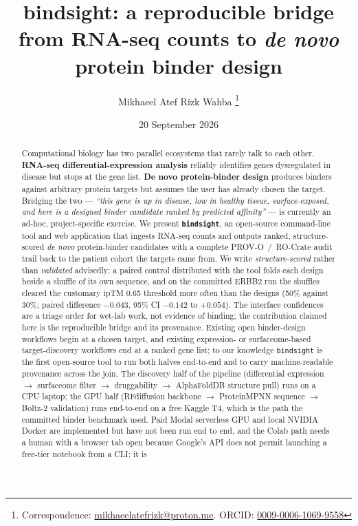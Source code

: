 \documentclass[11pt,letterpaper]{article}
\title{\textbf{bindsight: a reproducible bridge from RNA-seq counts to \textit{de novo} protein binder design}}
\author[1]{Mikhaeel Atef Rizk Wahba%
  \thanks{Correspondence: \href{mailto:mikhaeelatefrizk@proton.me}{mikhaeelatefrizk@proton.me}.
  ORCID: \href{https://orcid.org/0009-0006-1069-9558}{0009-0006-1069-9558}}}
\affil[1]{Independent Researcher, Cairo, Egypt}
\date{20 September 2026}
\begin{document}
\maketitle

\begin{abstract}
\noindent
Computational biology has two parallel ecosystems that rarely talk to each
other. \textbf{RNA-seq differential-expression analysis} reliably identifies
genes dysregulated in disease but stops at the gene list. \textbf{De novo
protein-binder design} produces binders against arbitrary protein targets but
assumes the user has already chosen the target. Bridging the two —
\textit{``this gene is up in disease, low in healthy tissue, surface-exposed,
and here is a designed binder candidate ranked by predicted affinity''} —
is currently an ad-hoc, project-specific exercise. We present
\textbf{\texttt{bindsight}}, an open-source command-line tool and web
application that ingests RNA-seq counts and outputs ranked,
structure-scored \textit{de novo} protein-binder candidates with a complete
PROV-O~/~RO-Crate audit trail back to the patient cohort the targets came
from. We write \emph{structure-scored} rather than \emph{validated}
advisedly: a paired control distributed with the tool folds each design beside
a shuffle of its own sequence, and on the committed ERBB2 run the shuffles
cleared the customary ipTM 0.65 threshold more often than the designs
(50\% against 30\%; paired difference $-0.043$, 95\% CI $-0.142$ to
$+0.054$). The interface confidences are a triage order for wet-lab work, not
evidence of binding; the contribution claimed here is the reproducible bridge
and its provenance. Existing open binder-design workflows begin at a chosen target, and
existing expression- or surfaceome-based target-discovery workflows end at a
ranked gene list; to our knowledge \texttt{bindsight} is the first open-source
tool to run both halves end-to-end and to carry machine-readable provenance
across the join. The discovery half of the pipeline (differential expression $\to$
surfaceome filter $\to$ druggability $\to$ AlphaFoldDB structure pull) runs
on a CPU laptop; the GPU half (RFdiffusion backbone $\to$
ProteinMPNN sequence $\to$ Boltz-2 validation) runs end-to-end on a free
Kaggle T4, which is the path the committed binder benchmark used. Paid Modal
serverless GPU and local NVIDIA Docker are implemented but have not been run
end to end, and the Colab path needs a human with a browser tab open because
Google's API does not permit launching a free-tier notebook from a CLI; it is

\end{abstract}
\end{document}
